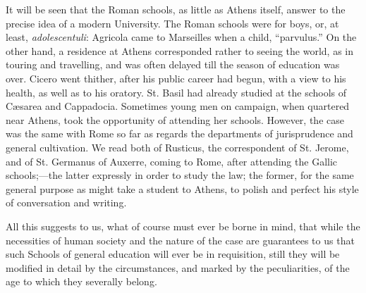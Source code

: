 It will be seen that the Roman schools, as little as Athens itself,
answer to the precise idea of a modern University. The Roman schools
were for boys, or, at least, \emph{adolescentuli}: Agricola came to
Marseilles when a child, ``parvulus.'' On the other hand, a
residence at Athens corresponded rather to seeing the world, as in
touring and travelling, and was often delayed till the season of
education was over. Cicero went thither, after his public career had
begun, with a view to his health, as well as to his oratory. St. Basil
had already studied at the schools of Cæsarea and Cappadocia.
Sometimes young men on campaign, when quartered near Athens, took the
opportunity of attending her schools. However, the case was the same
with Rome so far as regards the departments of jurisprudence and
general cultivation. We read both of Rusticus, the correspondent of
St. Jerome, and of St. Germanus of Auxerre, coming to Rome, after
attending the Gallic schools;—the latter expressly in order to study
the law; the former, for the same general purpose as might take a
student to Athens, to polish and perfect his style of conversation and
writing.

All this suggests to us, what of course must ever be borne in mind,
that while the necessities of human society and the nature of
the case are guarantees to us that such Schools of general education
will ever be in requisition, still they will be modified in detail by
the circumstances, and marked by the peculiarities, of the age to
which they severally belong.


